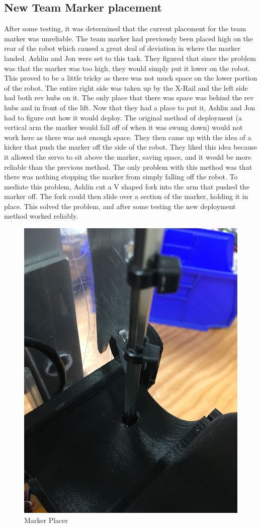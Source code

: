 \documentclass{article}
\begin{document}
\subsection{New Team Marker placement}
After some testing, it was determined that the current placement for the team marker was unreliable. The team marker had previously been placed high on the rear of the robot which caused a great deal of deviation in where the marker landed. Ashlin and Jon were set to this task. They figured that since the problem was that the marker was too high, they would simply put it lower on the robot. This proved to be a little tricky as there was not much space on the lower portion of the robot. The entire right side was taken up by the X-Rail and the left side had both rev hubs on it. The only place that there was space was behind the rev hubs and in front of the lift. Now that they had a place to put it, Ashlin and Jon had to figure out how it would deploy. The original method of deployment (a vertical arm the marker would fall off of when it was swung down) would not work here as there was not enough space. They then came up with the idea of a kicker that push the marker off the side of the robot. They liked this idea because it allowed the servo to sit above the marker, saving space, and it would be more reliable than the previous method. The only problem with this method was that there was nothing stopping the marker from simply falling off the robot. To mediate this problem, Ashlin cut a V shaped fork into the arm that pushed the marker off. The fork could then slide over a section of the marker, holding it in place. This solved the problem, and after some testing the new deployment method worked reliably.

\begin{figure}
    \centering
    \includegraphics[width=.6 \textwidth]{20_01-14/images/markerplacer.JPG}
    \caption{Marker Placer}
    \label{fig:markerplacer}
\end{figure}
\end{document}
